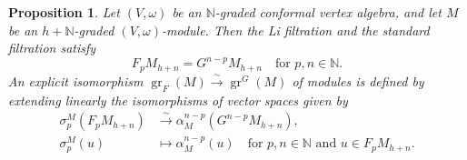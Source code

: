 \documentclass[a4paper, 12pt, reqno]{amsart}
\newtheorem{proposition}[theorem]{Proposition}
\theoremstyle{remark}
\DeclareMathOperator{\gr}{gr}
\begin{document}
\begin{proposition}
  \label{prp:20}
  Let $(V, \omega)$ be an $\mathbb{N}$-graded conformal vertex algebra, and let $M$ be an $h + \mathbb{N}$-graded $(V, \omega)$-module.
  Then the Li filtration and the standard filtration satisfy
  \begin{equation*}
    F_pM_{h + n} = G^{n - p}M_{h + n} \quad \text{for $p, n \in \mathbb{N}$}.
  \end{equation*}
  An explicit isomorphism $\gr_F(M) \xrightarrow{\sim} \gr^G(M)$ of modules is defined by extending linearly the isomorphisms of vector spaces given by
  \begin{align*}
    \sigma^M_p(F_pM_{h + n}) &\xrightarrow{\sim} \alpha^{n - p}_M(G^{n - p}M_{h + n}), \\
    \sigma^M_p(u) &\mapsto \alpha^{n - p}_M(u) \quad \text{for $p, n \in \mathbb{N}$ and $u \in F_pM_{h + n}$}.
  \end{align*}
\end{proposition}
\end{document}
